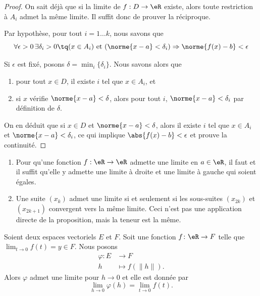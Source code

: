 \begin{proof}On sait déjà que si la limite de $f : D \to \eR$
  existe, alors toute restriction à $A_i$ admet la même limite. Il
  suffit donc de prouver la réciproque.

  Par hypothèse, pour tout $i = 1 \ldots k$, nous savons que
  \begin{equation*}
    \forall \epsilon > 0\, \exists \delta_i > 0 \tq (x \in A_i)
    \text{ et }
    (\norme{x-a} < \delta_i) \Rightarrow \norme{f(x) - b} < \epsilon
  \end{equation*}

  Si $\epsilon$ est fixé, posons $\delta = \min_i\{\delta_i\}$. Nous
  savons alors que
  \begin{enumerate}
  \item pour tout $x \in D$, il existe $i$ tel que $x \in A_i$, et
  \item si $x$ vérifie $\norme{x-a} < \delta$, alors pour tout $i$,
    $\norme{x-a} < \delta_i$ par définition de $\delta$.
  \end{enumerate}

  On en déduit que si $x \in D$ et $\norme{x-a} < \delta$, alors il
  existe $i$ tel que $x \in A_i$ et $\norme{x-a} < \delta_i$, ce qui
  implique $\abs{f(x) - b} < \epsilon$ et prouve la continuité.
\end{proof}

\begin{example}
  \begin{enumerate}
  \item Pour qu'une fonction $f : \eR \to \eR$ admette une limite en
    $a \in \eR$, il faut et il suffit qu'elle y admette une limite à
    droite et une limite à gauche qui soient égales.

  \item Une suite $(x_k)$ admet une limite si et seulement si les
    sous-suites $(x_{2k})$ et $(x_{2k+1})$ convergent vers la même
    limite. Ceci n'est pas une application directe de la proposition,
    mais la teneur est la même.
  \end{enumerate}
\end{example}

\begin{lemma}
    Soient deux espaces vectoriels \( E\) et \( F\). Soit une fonction \( f\colon \eR\to F\) telle que \( \lim_{t\to 0} f(t)=y\in F\). Nous posons 
    \begin{equation}
        \begin{aligned}
            \varphi\colon E&\to F \\
            h&\mapsto f(\| h \|). 
        \end{aligned}
    \end{equation}
    Alors \( \varphi\) admet une limite pour \( h\to 0\) et elle est donnée par
    \begin{equation}
        \lim_{h\to 0} \varphi(h)=\lim_{t\to 0} f(t).
    \end{equation}
\end{lemma}

